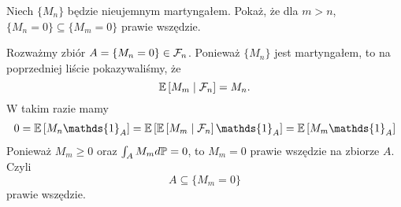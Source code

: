 \begin{problem}
  Niech $\{M_n\}$ będzie nieujemnym martyngałem. Pokaż, że dla $m>n$, $\{M_n=0\}\subseteq\{M_m=0\}$ prawie wszędzie.
\end{problem}

\begin{solution}
  Rozważmy zbiór $A=\{M_n=0\}\in\mathcal{F}_n$. Ponieważ $\{M_n\}$ jest martyngałem, to na poprzedniej liście pokazywaliśmy, że
  $$\expected{M_m}{\set{F}_n}=M_n.$$
  W takim razie mamy
  \begin{align*}
    0=\expected{M_n\mathds{1}_A}=\expected{\expected{M_m}{\set{F}_n}\mathds{1}_A}=\expected{M_m\mathds{1}_A}
  \end{align*}
  Ponieważ $M_m\geq0$ oraz $\int_AM_md\prob=0$, to $M_m=0$ prawie wszędzie na zbiorze $A$. Czyli 
  $$A\subseteq\{M_m=0\}$$ 
  prawie wszędzie.

%
%
%
\end{solution}
